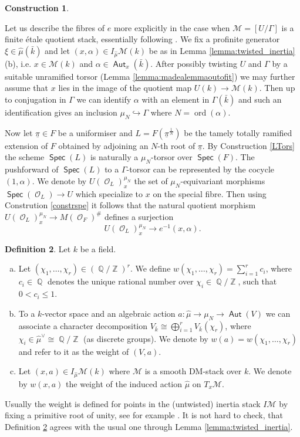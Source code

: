 \documentclass{article}
\DeclareMathOperator{\Zb}{\mathbb{Z}}
\DeclareMathOperator{\Aut}{\mathsf{Aut}}
\newcommand{\Mc}{\mathcal{M}}
\DeclareMathOperator{\Spec}{\mathsf{Spec}}
\DeclareMathOperator{\Oo}{\mathcal{O}}
\DeclareMathOperator{\ord}{ord}
\DeclareMathOperator{\Qb}{\mathbb{Q}}
\theoremstyle{definition}
\newtheorem{definition}{Definition}[section]
\newtheorem{construction}[definition]{Construction}
\theoremstyle{plain}
\begin{document}
\begin{construction}\label{totramlift}

Let us describe the fibres of $e$ more explicitly in the case when $\Mc=[U/\Gamma]$ is a finite \'etale quotient stack, essentially following \cite[Section 2]{DL2002}. We fix a profinite generator $\xi \in \widehat{\mu}(\bar k)$ and let $(x,\alpha) \in I_{\widehat{\mu}}\Mc(k)$ be as in Lemma \ref{lemma:twisted_inertia} (b), i.e. $x \in \Mc(k)$ and $\alpha \in \Aut_x(\bar{k})$. After possibly twisting $U$ and $\Gamma$ by a suitable unramified torsor (Lemma \ref{lemma:madealemmaoutofit}) we may further assume that $x$ lies in the image of the quotient map $U(k) \to \Mc(k)$. Then up to conjugation in $\Gamma$ we can identify $\alpha$ with an element in $\Gamma(\bar{k})$ and such an identification gives an inclusion $\mu_N \hookrightarrow \Gamma$ where $N = \ord(\alpha)$.

Now let $\underline{\pi} \in F$ be a uniformiser and $L = F(\underline{\pi}^{\frac{1}{N}})$ be the tamely totally ramified extension of $F$ obtained by adjoining an $N$-th root of $\underline{\pi}$. By Construction \ref{LTors} the scheme $\Spec(L)$ is naturally a $\mu_N$-torsor over $\Spec(F)$. The pushforward of $\Spec(L)$ to a $\Gamma$-torsor can be represented by the cocycle $(1,\alpha)$. We denote by $U(\Oo_L)^{\mu_N}_x$ the set of $\mu_N$-equivariant morphisms $\Spec(\Oo_L) \to U$ which specialize to $x$ on the special fibre. Then using Constrution \ref{constrspe} it follows that the natural quotient morphism $U(\Oo_L)^{\mu_N}_x \to M(\Oo_F)^\#$ defines a surjection
\begin{equation}\label{liftingsq} U(\Oo_L)^{\mu_N}_x \to e^{-1}(x,\alpha).\end{equation}
\end{construction}

\begin{definition}\label{defi:weight}
Let $k$ be a field.
\begin{enumerate}[(a)]
\item Let $(\chi_1,\dots,\chi_r) \in (\Qb/\Zb)^r$. We define $w(\chi_1,\dots,\chi_r) = \sum_{i=1}^r c_i$, where $c_i\in \Qb$ denotes the unique rational number over $\chi_i \in \Qb/\Zb$, such that $0 < c_i \leq 1$.
\item To a $k$-vector space and an algebraic action $a\colon \widehat{\mu} \to \mu_N \to \Aut(V)$ we can associate a character decomposition $V_{\bar{k}} \cong \bigoplus_{i=1}^rV_{\bar{k}}(\chi_r)$, where $\chi_i \in \widehat{\mu}^{\vee} \cong \Qb/\Zb$ (as discrete groups). We denote by $w(a) = w(\chi_1,\dots,\chi_r)$ and refer to it as the weight of $(V,a)$.
\item Let $(x,a) \in I_{\widehat{\mu}}\Mc(k)$ where $\Mc$ is a smooth DM-stack over $k$. We denote by $w(x,a)$ the weight of the induced action $\widehat{\mu}$ on $T_x\Mc$.
\end{enumerate}
\end{definition}
Usually the weight is defined for points in the (untwisted) inertia stack $I\Mc$ by fixing a primitive root of unity, see for example \cite[Remark A.2]{gwz}. It is not hard to check, that Definition \ref{defi:weight} agrees with the usual one through Lemma \ref{lemma:twisted_inertia}.
\end{document}
